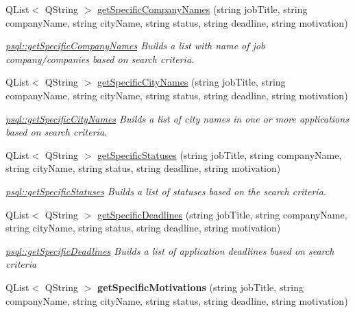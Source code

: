 \begin{DoxyCompactItemize}
Q\+List$<$ Q\+String $>$ \hyperlink{classpsql_ac2528de5054ba99371d2d796ed32b2b1}{get\+Specific\+Company\+Names} (string job\+Title, string company\+Name, string city\+Name, string status, string deadline, string motivation)
\begin{DoxyCompactList}\small\item\em \hyperlink{classpsql_ac2528de5054ba99371d2d796ed32b2b1}{psql\+::get\+Specific\+Company\+Names} Builds a list with name of job company/companies based on search criteria. \end{DoxyCompactList}\item 
Q\+List$<$ Q\+String $>$ \hyperlink{classpsql_aace910a1e695138795d6e41765908784}{get\+Specific\+City\+Names} (string job\+Title, string company\+Name, string city\+Name, string status, string deadline, string motivation)
\begin{DoxyCompactList}\small\item\em \hyperlink{classpsql_aace910a1e695138795d6e41765908784}{psql\+::get\+Specific\+City\+Names} Builds a list of city names in one or more applications based on search criteria. \end{DoxyCompactList}\item 
Q\+List$<$ Q\+String $>$ \hyperlink{classpsql_aa04154eae71d7cdfd0fb8ab67ac032e7}{get\+Specific\+Statuses} (string job\+Title, string company\+Name, string city\+Name, string status, string deadline, string motivation)
\begin{DoxyCompactList}\small\item\em \hyperlink{classpsql_aa04154eae71d7cdfd0fb8ab67ac032e7}{psql\+::get\+Specific\+Statuses} Builds a list of statuses based on the search criteria. \end{DoxyCompactList}\item 
Q\+List$<$ Q\+String $>$ \hyperlink{classpsql_a415ebb495b96ac805880401555f72825}{get\+Specific\+Deadlines} (string job\+Title, string company\+Name, string city\+Name, string status, string deadline, string motivation)
\begin{DoxyCompactList}\small\item\em \hyperlink{classpsql_a415ebb495b96ac805880401555f72825}{psql\+::get\+Specific\+Deadlines} Builds a list of application deadlines based on search criteria \end{DoxyCompactList}\item 
\mbox{\label{classpsql_a7c86e4ba33784dece1bf897537087a68}} 
Q\+List$<$ Q\+String $>$ {\bfseries get\+Specific\+Motivations} (string job\+Title, string company\+Name, string city\+Name, string status, string deadline, string motivation)

\end{DoxyCompactItemize}
